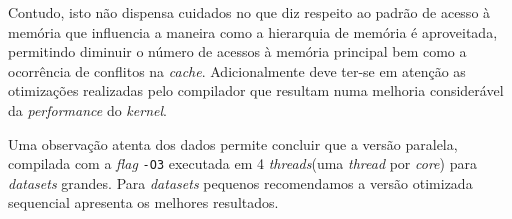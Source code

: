 \documentclass{article}
\begin{document}
Contudo, isto não dispensa cuidados no que diz respeito ao padrão de acesso à memória que influencia a maneira como a hierarquia de memória é aproveitada, permitindo 
diminuir o número de acessos à memória principal bem como a ocorrência de conflitos na \textit{cache}. Adicionalmente deve ter-se em atenção as otimizações realizadas 
pelo compilador que resultam numa melhoria considerável da \textit{performance} do \textit{kernel}.

Uma observação atenta dos dados permite concluir que a versão paralela, compilada com a \textit{flag} \texttt{-O3} executada em 4 \textit{threads}(uma \textit{thread} por \textit{core}) para \textit{datasets} grandes. Para \textit{datasets} pequenos recomendamos a versão otimizada sequencial apresenta os melhores resultados.

\newpage 

\end{document}
